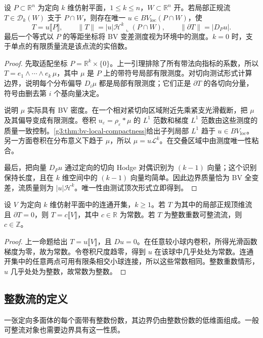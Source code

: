 \begin{proposition}\label{g3:prop:normal-plane-bv}
	设 \(P\subset\mathbb R^n\) 为定向 \(k\) 维仿射平面，\(1\le k\le n\)，\(W\subset\mathbb R^n\) 开。若局部正规流 \(T\in\mathcal D_k(W)\) 支于 \(P\cap W\)，则存在唯一 \(u\in BV_{\mathrm{loc}}(P\cap W)\)，使
	\[
		T=u\lBrack P\rBrack,
		\qquad \|T\|=|u|\mathcal H^k\llcorner(P\cap W),
		\qquad \|\partial T\|=|D_Pu|.
	\]
	最后一个等式以 \(P\) 的等距坐标将 BV 变差测度视为环境中的测度。\(k=0\) 时，支于单点的有限质量流是该点流的实倍数。
\end{proposition}
\begin{proof}
	先取适配坐标 \(P=\mathbb R^k\times\{0\}\)。上一引理排除了所有带法向指标的系数，所以 \(T=e_1\wedge\cdots\wedge e_k\,\mu\)，其中 \(\mu\) 是 \(P\) 上的带符号局部有限测度。对切向测试形式计算边界，说明每个分布偏导 \(D_i\mu\) 都是局部有限测度；它们正是 \(\partial T\) 的各切向分量，符号由删去第 \(i\) 个基向量决定。

	说明 \(\mu\) 实际具有 BV 密度。在一个相对紧切向区域附近先乘紧支光滑截断，把 \(\mu\) 及其偏导变成有限测度。卷积 \(u_\varepsilon=\rho_\varepsilon*\mu\) 的 \(L^1\) 范数和梯度 \(L^1\) 范数由这些测度的质量一致控制。\cref{g3:thm:bv-local-compactness}给出子列局部 \(L^1\) 趋于 \(u\in BV_{\mathrm{loc}}\)。另一方面卷积在分布意义下趋于 \(\mu\)，所以 \(\mu=u\mathcal L^k\)。在交叠区域中由测度唯一性粘合。

	最后，把向量 \(D_Pu\) 通过定向的切向 Hodge 对偶识别为 \((k-1)\) 向量；这个识别保持长度，且在 \(k\) 维空间中的 \((k-1)\) 向量均简单。因此边界质量恰为 BV 全变差，流质量则为 \(|u|\mathcal H^k\)。唯一性由测试顶次形式立即得到。
\end{proof}

\begin{theorem}[常数定理]\label{g3:thm:current-constancy}
	设 \(V\) 为定向 \(k\) 维仿射平面中的连通开集，\(k\ge1\)。若 \(T\) 为其中的局部正规顶维流且 \(\partial T=0\)，则 \(T=c\lBrack V\rBrack\)，其中 \(c\in\mathbb R\) 为常数。若 \(T\) 为整数重数可整流流，则 \(c\in\mathbb Z\)。
\end{theorem}
\begin{proof}
	上一命题给出 \(T=u\lBrack V\rBrack\)，且 \(Du=0\)。在任意较小球内卷积，所得光滑函数梯度为零，故为常数。令卷积尺度趋零，得到 \(u\) 在该球中几乎处处为常数。连通开集中的任意两点可用有限条相交小球连接，所以这些常数相同。整数重数情形，\(u\) 几乎处处为整数，故常数为整数。
\end{proof}

\subsection{整数流的定义}
\label{g3:subsec:2202:03}
一张定向多面体的每个面带有整数份数，其边界仍由整数份数的低维面组成。一般可整流对象也需要边界具有这一性质。


